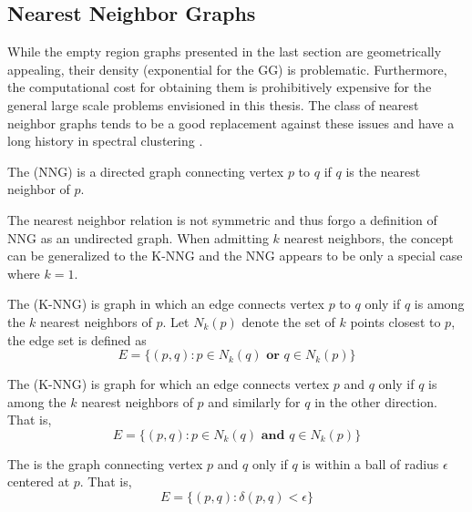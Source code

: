 \subsection{Nearest Neighbor Graphs}

While the empty region graphs presented in the last section are geometrically appealing, their density (exponential for the GG) is problematic. Furthermore, the computational cost for obtaining them is prohibitively expensive for the general large scale problems envisioned in this thesis. The class of nearest neighbor graphs tends to be a good replacement against these issues and have a long history in spectral clustering \parencite{Luxburg2007}.

\begin{defn}
The  (NNG) is a directed graph connecting vertex $p$ to $q$ if $q$ is the nearest neighbor of $p$.
\end{defn}

The nearest neighbor relation is not symmetric and thus forgo a definition of NNG as an undirected graph. When admitting $k$ nearest neighbors, the concept can be generalized to the K-NNG \parencite{Miller1997} and the NNG appears to be only a special case where $k=1$.

\begin{defn}
The  (K-NNG) is graph in which an edge connects vertex $p$ to $q$ only if $q$ is among the $k$ nearest neighbors of $p$. Let $N_k(p)$ denote the set of $k$ points closest to $p$, the edge set is defined as
\begin{equation}
E = \{ (p, q) : p \in N_k(q) \textbf{ or } q \in N_k(p) \}
\end{equation}
\end{defn}

\begin{defn}
The  (K-NNG) is graph for which an edge connects vertex $p$ and $q$ only if $q$ is among the $k$ nearest neighbors of $p$ and similarly for $q$ in the other direction. That is, 
\begin{equation}
E = \{ (p, q) : p \in N_k(q) \textbf{ and } q \in N_k(p) \}
\end{equation}
\end{defn}

\begin{defn}
The  is the graph connecting vertex $p$ and $q$ only if $q$ is within a ball of radius $\epsilon$ centered at $p$. That is, 
\begin{equation}
E = \{ (p, q) : \delta(p, q) < \epsilon \}
\end{equation}
\end{defn}

